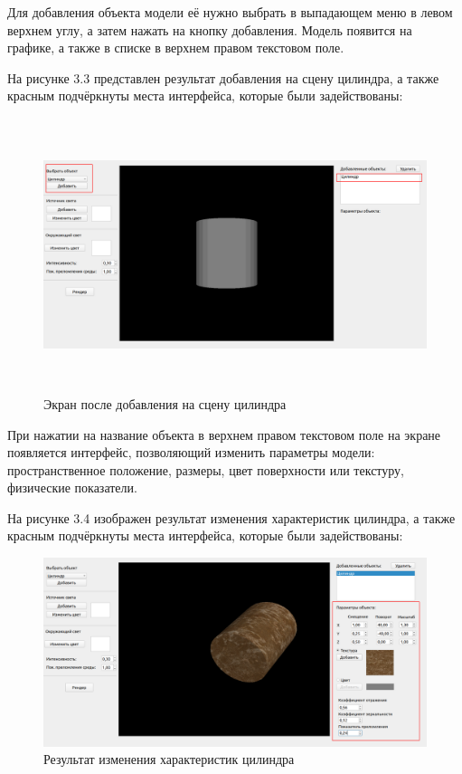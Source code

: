 Для добавления объекта модели её нужно выбрать в выпадающем меню в левом верхнем углу, а затем нажать на кнопку добавления.
Модель появится на графике, а также в списке в верхнем правом текстовом поле.

На рисунке 3.3 представлен результат добавления на сцену цилиндра, а также красным подчёркнуты места интерфейса, которые были задействованы:
\FloatBarrier
\begin{figure}[h]
	\begin{center}
		\includegraphics[height = 8cm, width=\linewidth]{inc/add.png}
	\end{center}
	\caption{Экран после добавления на сцену цилиндра}
\end{figure}
\FloatBarrier

При нажатии на название объекта в верхнем правом текстовом поле на экране появляется интерфейс, 
позволяющий изменить параметры модели: пространственное положение, размеры, цвет поверхности или текстуру, физические показатели.

На рисунке 3.4 изображен результат изменения характеристик цилиндра, а также красным подчёркнуты места интерфейса, которые были задействованы:
\FloatBarrier
\begin{figure}[h]
	\begin{center}
		\includegraphics[width=\linewidth]{inc/change.png}
	\end{center}
	\caption{Результат изменения характеристик цилиндра}
\end{figure}
\FloatBarrier

